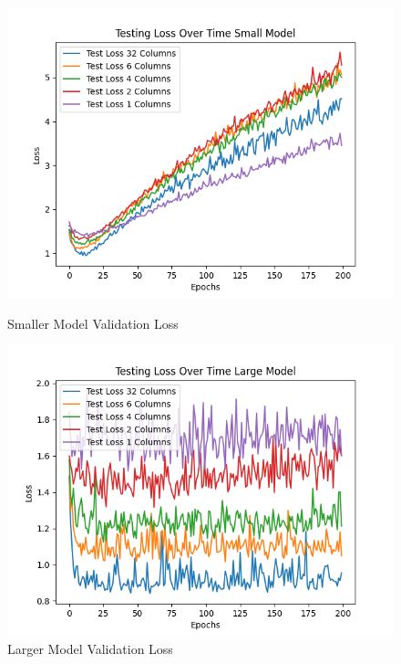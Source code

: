 \documentclass{article}
\begin{document}
\begin{figure}[!htb]
		\includegraphics[width = \linewidth]{figures/test_loss_over_time_small.png}
		\caption{Smaller Model Validation Loss}
	\endminipage\hfill
		\includegraphics[width = \linewidth]{figures/test_loss_over_time_large_model.png}
		\caption{Larger Model Validation Loss}
	\endminipage\hfill	
\end{figure}
\end{document}
